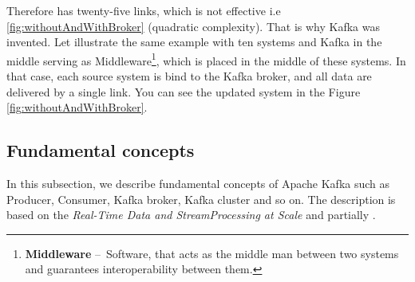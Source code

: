 Therefore has twenty-five links, which is not effective i.e \ref{fig:withoutAndWithBroker} (quadratic complexity). That is why Kafka was invented. Let illustrate the same example with ten systems and Kafka in the middle serving as Middleware\footnote{\textbf{Middleware} \---\ Software, that acts as the middle man between two systems and guarantees interoperability between them.}, which is placed in the middle of these systems. In that case, each source system is bind to the Kafka broker, and all data are delivered by a single link. You can see the updated system in the Figure \ref{fig:withoutAndWithBroker}.

\subsection*{Fundamental concepts}

In this subsection, we describe fundamental concepts of Apache Kafka such as Producer, Consumer, Kafka broker, Kafka cluster and so on. The description is based on the \emph{Real-Time Data and StreamProcessing at Scale} \cite{apacheKafkaDefinitiveGuide} and partially \cite{kafkaDocumentation}. 

